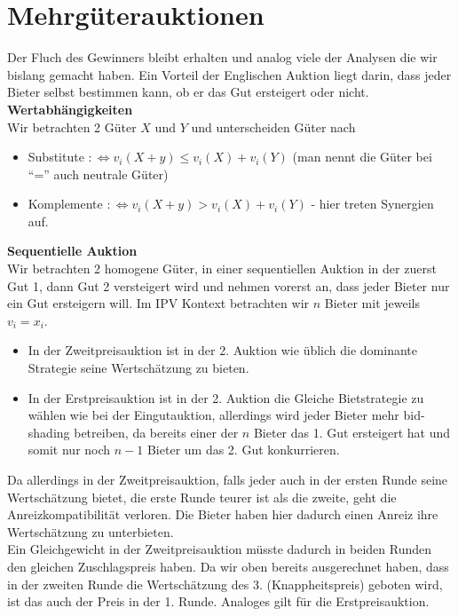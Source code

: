\documentclass[12pt]{extreport} %
\theoremstyle{named}
\theoremstyle{nnamed}
\theoremstyle{itshape}
\theoremstyle{normal}
\begin{document}
\chapter{Mehrgüterauktionen}


Der Fluch des Gewinners bleibt erhalten und analog viele der Analysen die wir bislang gemacht haben. Ein Vorteil der Englischen Auktion liegt darin, dass jeder Bieter selbst bestimmen kann, ob er das Gut ersteigert oder nicht. ~\\

\textbf{Wertabhängigkeiten} ~\\
Wir betrachten 2 Güter $X$ und $Y$ und unterscheiden Güter nach
\begin{itemize}
	\item Substitute  $:\iff v_{i}(X + y) \leq v_{i}(X) + v_{i}(Y)$  (man nennt die Güter bei \enquote{=} auch neutrale Güter)  
	\item Komplemente $:\iff v_{i}(X + y)   >  v_{i}(X) + v_{i}(Y)$ - hier treten Synergien auf.
\end{itemize}


\textbf{Sequentielle Auktion} ~\\
Wir betrachten 2 homogene Güter, in einer sequentiellen Auktion in der zuerst Gut 1, dann Gut 2 versteigert wird und nehmen vorerst an, dass jeder Bieter nur ein Gut ersteigern will. Im IPV Kontext betrachten wir $n$ Bieter mit jeweils $v_{i} = x_{i}$. 


\begin{itemize}
	\item In der Zweitpreisauktion ist in der 2. Auktion wie üblich die dominante Strategie seine Wertschätzung zu bieten. 
	\item In der Erstpreisauktion ist in der 2. Auktion die Gleiche Bietstrategie zu wählen wie bei der Eingutauktion, allerdings wird jeder Bieter mehr bid-shading betreiben, da bereits einer der $n$ Bieter das 1. Gut ersteigert hat und somit nur noch $n-1$ Bieter um das 2. Gut konkurrieren.
\end{itemize}

Da allerdings in der Zweitpreisauktion, falls jeder auch in der ersten Runde seine Wertschätzung bietet, die erste Runde teurer ist als die zweite, geht die Anreizkompatibilität verloren. Die Bieter haben hier dadurch einen Anreiz ihre Wertschätzung zu unterbieten. ~\\

Ein Gleichgewicht in der Zweitpreisauktion müsste dadurch in beiden Runden den gleichen Zuschlagspreis haben. Da wir oben bereits ausgerechnet haben, dass in der zweiten Runde die Wertschätzung des 3. (Knappheitspreis) geboten wird, ist das auch der Preis in der 1. Runde. Analoges gilt für die Erstpreisauktion. ~\\
\end{document}
